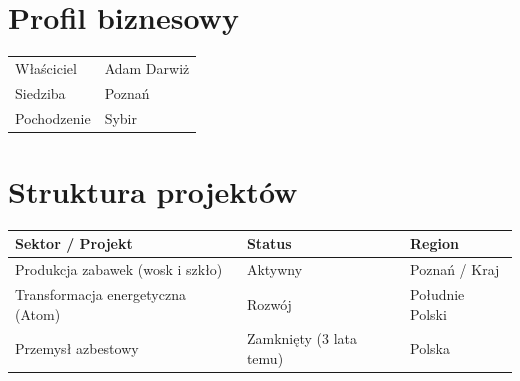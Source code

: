 \section*{Profil biznesowy}
\begin{tabularx}{\textwidth}{lX}
\toprule
Właściciel & Adam Darwiż \\
Siedziba & Poznań \\
Pochodzenie & Sybir \\
\bottomrule
\end{tabularx}

\section*{Struktura projektów}
\begin{tabularx}{\textwidth}{Xll}
\toprule
Sektor / Projekt & Status & Region \\
\midrule
Produkcja zabawek (wosk i szkło) & Aktywny & Poznań / Kraj \\
Transformacja energetyczna (Atom) & Rozwój & Południe Polski \\
Przemysł azbestowy & Zamknięty (3 lata temu) & Polska \\
\bottomrule
\end{tabularx}